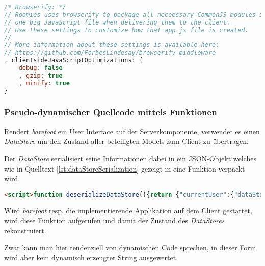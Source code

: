 \begin{lstlisting}[language=JavaScript, firstnumber=95, caption={Konfiguration der browserify Middleware \cite{RoomiesExampleConfig}}, label=lst:configBrowserifyMiddleware]
/* Browserify: */
// Roomies uses browserify to package all neceessary CommonJS modules into
// one big JavaScript file when delivering them to the client.
// Use these settings to customize how that app.js file is created.
//
// More information about these settings is available here:
// https://github.com/ForbesLindesay/browserify-middleware
, clientsideJavaScriptOptimizations: {
	debug: false
	, gzip: true
	, minify: true
}
\end{lstlisting}


\subsubsection*{Pseudo-dynamischer Quellcode mittels Funktionen}

Rendert \emph{barefoot} ein User Interface auf der Serverkomponente, verwendet es einen \emph{DataStore} \cite{barefootDatastore} um den Zustand aller beteiligten Models zum Client zu übertragen.

Der \emph{DataStore} serialisiert seine Informationen dabei in ein \gls{JSON}-Objekt welches wie in Quelltext \ref{lst:dataStoreSerialization} gezeigt in eine Funktion verpackt wird.

\begin{lstlisting}[language=HTML, caption={Ausschnitt eines von \emph{barefoot} serialisierten \emph{DataStores} im HTML Markup von \emph{Roomies}}, label={lst:dataStoreSerialization}]
<script>function deserializeDataStore(){return {"currentUser":{"dataStoreModelIdentifier":"ResidentModel","data":/* ... */[{"name":"BA abgeben","description":"","reward":5,"fulfilledAt":null,"dueDate":"2013-06-14T00:00:00.000Z","id":1,"createdAt":"2013-06-03T20:28:58.000Z","updatedAt":"2013-06-03T20:28:58.000Z","CommunityId":1,"creatorId":1,"fulfillorId":null}]}};}</script>
\end{lstlisting}

Wird \emph{barefoot} resp. die implementierende Applikation auf dem Client gestartet, wird diese Funktion aufgerufen und damit der Zustand des \emph{DataStores} rekonstruiert.

Zwar kann man hier tendenziell von dynamischen Code sprechen, in dieser Form wird aber kein dynamisch erzeugter String ausgewertet.



